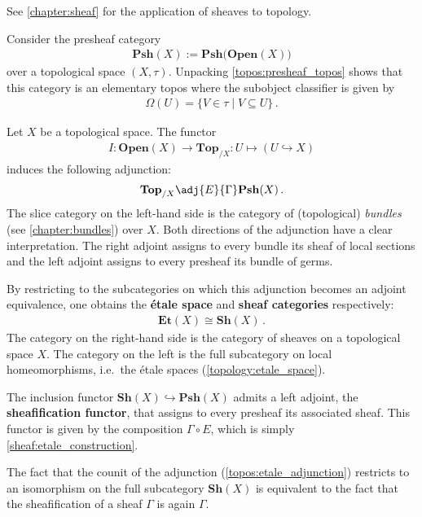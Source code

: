     See \cref{chapter:sheaf} for the application of sheaves to topology.

    \begin{property}\label{topos:sheaf_topos}
        Consider the presheaf category
        \begin{gather}
            \mathbf{Psh}(X):=\mathbf{Psh\bigl(Open}(X)\bigr)
        \end{gather}
        over a topological space $(X,\tau)$. Unpacking \cref{topos:presheaf_topos} shows that this category is an elementary topos where the subobject classifier is given by
        \begin{gather}
            \Omega(U) = \{V\in\tau\mid V\subseteq U\}\,.
        \end{gather}
    \end{property}

    \begin{construct}\label{topos:etale_adjunction}
        Let $X$ be a topological space. The functor
        \begin{gather}
            I:\mathbf{Open}(X)\rightarrow\mathbf{Top}_{/X}:U\mapsto(U\hookrightarrow X)
        \end{gather}
        induces the following adjunction:
        \begin{gather}
            \mathbf{Top}_{/X}\adj{E}{\Gamma}\mathbf{Psh}(X)\,.
        \end{gather}
        The slice category on the left-hand side is the category of (topological) \textit{bundles} (see \cref{chapter:bundles}) over $X$. Both directions of the adjunction have a clear interpretation. The right adjoint assigns to every bundle its sheaf of local sections and the left adjoint assigns to every presheaf its bundle of germs.

        By restricting to the subcategories on which this adjunction becomes an adjoint equivalence, one obtains the \textbf{\'etale space} and \textbf{sheaf categories} respectively:
        \begin{gather}
            \mathbf{Et}(X)\cong\mathbf{Sh}(X)\,.
        \end{gather}
        The category on the right-hand side is the category of sheaves on a topological space $X$. The category on the left is the full subcategory on local homeomorphisms, i.e.~the \'etale spaces (\cref{topology:etale_space}).
    \end{construct}

    \begin{property}
        The inclusion functor $\mathbf{Sh}(X)\hookrightarrow\mathbf{Psh}(X)$ admits a left adjoint, the \textbf{sheafification functor}, that assigns to every presheaf its associated sheaf. This functor is given by the composition $\Gamma\circ E$, which is simply \cref{sheaf:etale_construction}.

        The fact that the counit of the adjunction (\cref{topos:etale_adjunction}) restricts to an isomorphism on the full subcategory $\mathbf{Sh}(X)$ is equivalent to the fact that the sheafification of a sheaf $\Gamma$ is again $\Gamma$.
    \end{property}

